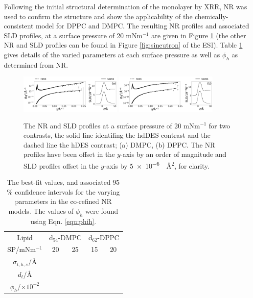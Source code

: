 \documentclass[amsmath,amssymb,twocolumn,superscriptaddress]{revtex4-1}
\begin{document}
Following the initial structural determination of the monolayer by XRR, NR was used to confirm the structure and show the applicability of the chemically-consistent model for DPPC and DMPC.
The resulting NR profiles and associated SLD profiles, at a surface pressure of 20 mNm$^{-1}$ are given in Figure \ref{fig:neutron} (the other NR and SLD profiles can be found in Figure \ref{fig:sineutron} of the ESI).
Table \ref{tab:neutron} gives details of the varied parameters at each surface pressure as well as $\phi_h$ as determined from NR.
%
\begin{figure}
    \centering
  \includegraphics[width=0.45\textwidth]{figures/dmpc_20n_ref_sld}
    \includegraphics[width=0.45\textwidth]{figures/dppc_20n_ref_sld}
    \caption{\small The NR and SLD profiles at a surface pressure of
  20 mNm$^{-1}$ for two contrasts, the solid line identifing the hdDES contrast and the dashed line the hDES contrast; (a) DMPC, (b) DPPC. The NR profiles have been offset in the $y$-axis by an order of magnitude and SLD profiles offset in the $y$-axis by \SI{5e-6}{\per\square\angstrom}, for clarity.}
    \label{fig:neutron}
\end{figure}
%
%
\begin{table}
  \caption{\label{tab:neutron} The best-fit values, and associated 95 \%
  confidence intervals for the varying parameters in the co-refined NR models.
  The values of $\phi_h$ were found using Eqn. \ref{equ:phih}.}
  \begin{ruledtabular}
    \begin{tabular*}{\textwidth}{ccccc}
    Lipid & \multicolumn{2}{c}{d$_{54}$-DMPC} & \multicolumn{2}{c}{d$_{62}$-DPPC} \\
    SP/mNm$^{-1}$ & 20 & 25 & 15 & 20 \\
    \hline
    $\sigma_{t,h,s}$/\si{\angstrom} &  &  &  &  \\
    $d_t$/\si{\angstrom} &  &  &  &  \\
    \hline
    $\phi_h$/$\times10^{-2}$ &  &  &  &  \\
    \end{tabular*}
  \end{ruledtabular}
\end{table}
%
\end{document}

